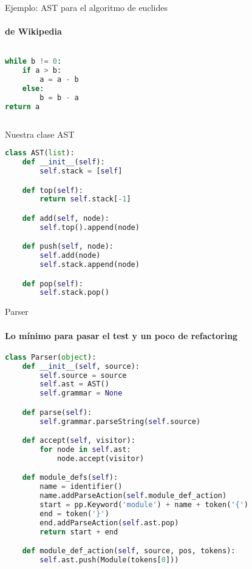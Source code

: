 \documentclass[11pt]{beamer}
\begin{document}
\begin{frame}[fragile]{Ejemplo: AST para el algoritmo de euclides}
\framesubtitle{de Wikipedia}
  \begin{columns}
    \begin{column}{3cm}
\begin{lstlisting}[language=Python]
while b != 0:
    if a > b:
        a = a - b
    else:
        b = b - a
return a
\end{lstlisting}
    \end{column}
    \begin{column}{7cm}

\end{column}
  \end{columns}

\end{frame}


\begin{frame}[fragile]{Nuestra clase AST}
\begin{lstlisting}[language=Python]
class AST(list):
    def __init__(self):
        self.stack = [self]

    def top(self):
        return self.stack[-1]

    def add(self, node):
        self.top().append(node)

    def push(self, node):
        self.add(node)
        self.stack.append(node)

    def pop(self):
        self.stack.pop()
\end{lstlisting}
\end{frame}

\begin{frame}[fragile]{Parser}
\framesubtitle{Lo mínimo para pasar el test y un poco de refactoring}

\begin{lstlisting}[language=Python]
class Parser(object):
    def __init__(self, source):
        self.source = source
        self.ast = AST()
        self.grammar = None

    def parse(self):
        self.grammar.parseString(self.source)

    def accept(self, visitor):
        for node in self.ast:
            node.accept(visitor)

    def module_defs(self):
        name = identifier()
        name.addParseAction(self.module_def_action)
        start = pp.Keyword('module') + name + token('{')
        end = token('}')
        end.addParseAction(self.ast.pop)
        return start + end

    def module_def_action(self, source, pos, tokens):
        self.ast.push(Module(tokens[0]))
\end{lstlisting}
\end{frame}
\end{document}
